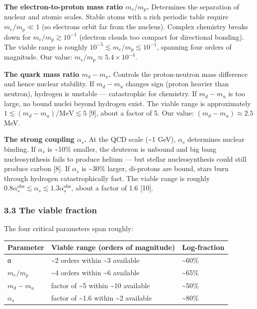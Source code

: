 \documentclass[
]{article}
\begin{document}
\textbf{The electron-to-proton mass ratio \(m_e / m_p\).} Determines the
separation of nuclear and atomic scales. Stable atoms with a rich
periodic table require \(m_e / m_p \ll 1\) (so electrons orbit far from
the nucleus). Complex chemistry breaks down for
\(m_e / m_p \gtrsim 10^{-1}\) (electron clouds too compact for
directional bonding). The viable range is roughly
\(10^{-5} \lesssim m_e / m_p \lesssim 10^{-1}\), spanning four orders of
magnitude. Our value: \(m_e / m_p \approx 5.4 \times 10^{-4}\).

\textbf{The quark mass ratio \(m_d - m_u\).} Controls the proton-neutron
mass difference and hence nuclear stability. If \(m_d - m_u\) changes
sign (proton heavier than neutron), hydrogen is unstable ---
catastrophic for chemistry. If \(m_d - m_u\) is too large, no bound
nuclei beyond hydrogen exist. The viable range is approximately
\(1 \lesssim (m_d - m_u) / \text{MeV} \lesssim 5\) {[}9{]}, about a
factor of 5. Our value: \((m_d - m_u) \approx 2.5\) MeV.

\textbf{The strong coupling \(\alpha_s\).} At the QCD scale
(\textasciitilde1 GeV), \(\alpha_s\) determines nuclear binding. If
\(\alpha_s\) is \textasciitilde10\% smaller, the deuteron is unbound and
big bang nucleosynthesis fails to produce helium --- but stellar
nucleosynthesis could still produce carbon {[}8{]}. If \(\alpha_s\) is
\textasciitilde30\% larger, di-protons are bound, stars burn through
hydrogen catastrophically fast. The viable range is roughly
\(0.8 \alpha_s^{\text{obs}} \lesssim \alpha_s \lesssim 1.3 \alpha_s^{\text{obs}}\),
about a factor of 1.6 {[}10{]}.

\hypertarget{the-viable-fraction}{%
\subsubsection{3.3 The viable fraction}\label{the-viable-fraction}}

The four critical parameters span roughly:

\begin{longtable}[]{@{}lll@{}}
\toprule\noalign{}
Parameter & Viable range (orders of magnitude) & Log-fraction \\
\midrule\noalign{}
\endhead
\bottomrule\noalign{}
\endlastfoot
α & \textasciitilde2 orders within \textasciitilde3 available &
\textasciitilde60\% \\
\(m_e / m_p\) & \textasciitilde4 orders within \textasciitilde6
available & \textasciitilde65\% \\
\(m_d - m_u\) & factor of \textasciitilde5 within \textasciitilde10
available & \textasciitilde50\% \\
\(\alpha_s\) & factor of \textasciitilde1.6 within \textasciitilde2
available & \textasciitilde80\% \\
\end{longtable}
\end{document}
